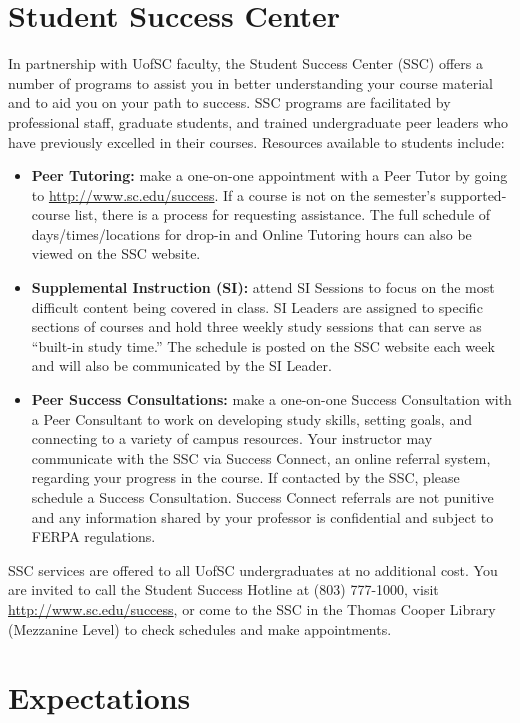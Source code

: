 \documentclass[10pt]{amsart}
\begin{document}
\section*{Student Success Center}
\noindent
In partnership with UofSC faculty, the Student Success Center (SSC) offers a number of programs to assist you in better understanding your course material and to aid you on your path to success. 
SSC programs are facilitated by professional staff, graduate students, and trained undergraduate peer leaders who have previously excelled in their courses.
Resources available to students include: 
\begin{itemize}
\item 
  \textbf{Peer Tutoring:} make a one-on-one appointment with a Peer Tutor by going to \url{http://www.sc.edu/success}. 
  If a course is not on the semester’s supported-course list, there is a process for requesting assistance. 
  The full schedule of days/times/locations for drop-in and Online Tutoring hours can also be viewed on the SSC website.
\item
  \textbf{Supplemental Instruction (SI):} attend SI Sessions to focus on the most difficult content being covered in class. 
  SI Leaders are assigned to specific sections of courses and hold three weekly study sessions that can serve as “built-in study time.” 
  The schedule is posted on the SSC website each week and will also be communicated by the SI Leader.
\item
  \textbf{Peer Success Consultations:} make a one-on-one Success Consultation with a Peer Consultant to work on developing study skills, setting goals, and connecting to a variety of campus resources. 
  Your instructor may communicate with the SSC via Success Connect, an online referral system, regarding your progress in the course. 
  If contacted by the SSC, please schedule a Success Consultation. 
  Success Connect referrals are not punitive and any information shared by your professor is confidential and subject to FERPA regulations.
\end{itemize}
SSC services are offered to all UofSC undergraduates at no additional cost.
You are invited to call the Student Success Hotline at (803) 777-1000, visit \url{http://www.sc.edu/success}, or come to the SSC in the Thomas Cooper Library (Mezzanine Level) to check schedules and make appointments. 

\section*{Expectations}
\noindent
\end{document}
